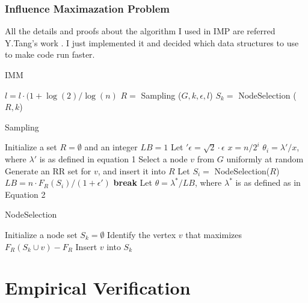 \documentclass[conference,compsoc]{IEEEtran}
\begin{document}
\subsubsection{Influence Maximazation Problem}
All the details and proofs about the algorithm I used in IMP are referred  Y.Tang's work \cite{IMM}. I just implemented it and decided which data structures to use to make code run faster. 
\begin{algorithm}
	\caption{IMM}
	\begin{algorithmic}[1]
		\State $l = l \cdot (1 + \log(2)/\log(n)$
		\State $R = $ Sampling ($G,k,\epsilon,l$)
		\State $S_k = $ NodeSelection ($R,k$)
		\EndFunction	
	\end{algorithmic}
\end{algorithm}



\begin{algorithm}[H]
	\caption{Sampling}
	\begin{algorithmic}[1]
		\State Initialize a set $R = \emptyset$ and an integer $LB = 1$
		\State Let $\prime{\epsilon} = \sqrt{2} \cdot \epsilon$ 
		\State $x = n/2^i$
		\State $\theta_i = \lambda\prime / x$, where $\lambda\prime$ is as defined in equation 1
		\State Select a node $v$ from $G$ uniformly at random
		\State Generate an RR set for $v$, and insert it into $R$
		\EndWhile
		\State Let $S_i = $ NodeSelection($R$)
		\State $LB = n \cdot F_R(S_i)/(1+\epsilon\prime)$ 
		\State \textbf{break}
		\EndIf	
		\EndFor
		\State Let $\theta = \lambda^\ast/LB$, where $\lambda^\ast$ is as defined as in Equation 2
		\EndFunction		
	\end{algorithmic}
\end{algorithm}

\begin{algorithm}
	\caption{NodeSelection}
	\begin{algorithmic}[1]
		\State Initialize a node set $S_k = \emptyset$
		\State Identify the vertex $v$ that maximizes $F_R(S_k \cup v) - F_R$
		\State Insert $v$ into $S_k$
		\EndFor
		\EndFunction
	\end{algorithmic}
\end{algorithm}

\section{Empirical Verification}
\end{document}
